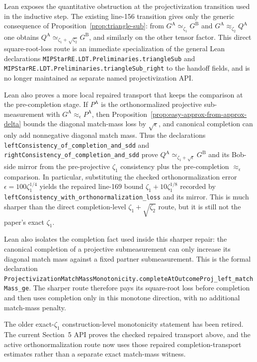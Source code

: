 \begin{remark}\label{rem:lean-line169-projectivization-match-mass}
	Lean exposes the quantitative obstruction at the projectivization transition used
	in the inductive step.  The existing line-156 transition gives only the generic
	consequence of Proposition~\ref{prop:triangle-sub}: from
	$G^{\mathrm A}\simeq_{\zeta_1}G^{\mathrm B}$ and
	$G^{\mathrm A}\approx_{\zeta_2}Q^{\mathrm A}$ one obtains
	$Q^{\mathrm A}\simeq_{\zeta_1+\sqrt{\zeta_2}}G^{\mathrm B}$, and similarly
	on the other tensor factor.  This direct square-root-loss route is an
	immediate specialization of the general Lean declarations
	\texttt{MIPStarRE.LDT.Preliminaries.triangleSub} and
	\texttt{MIPStarRE.LDT.Preliminaries.triangleSub\_right} to the handoff
	fields, and is no longer maintained as separate named projectivization API.

	Lean also proves a more local repaired transport that keeps the comparison at
	the pre-completion stage.  If $P^{\mathrm A}$ is the orthonormalized
	projective sub-measurement with $G^{\mathrm A}\approx_{\epsilon}P^{\mathrm A}$,
	then Proposition~\ref{prop:easy-approx-from-approx-delta} bounds the diagonal
	match-mass loss by $\sqrt{\epsilon}$, and canonical completion can only add
	nonnegative diagonal match mass.  Thus the declarations
	\texttt{leftConsistency\_of\_completion\_and\_sdd} and
	\texttt{rightConsistency\_of\_completion\_and\_sdd} prove
	$Q^{\mathrm A}\simeq_{\zeta_1+\sqrt{\epsilon}}G^{\mathrm B}$ and its Bob-side
	mirror from the pre-projective $\zeta_1$ consistency plus the
	pre-completion $\approx_{\epsilon}$ comparison.  In particular, substituting
	the checked orthonormalization error
	$\epsilon=100\zeta_1^{1/4}$ yields the repaired line-169 bound
	$\zeta_1+10\zeta_1^{1/8}$ recorded by
	\texttt{leftConsistency\_with\_orthonormalization\_loss} and its mirror.
	This is much sharper than the direct completion-level
	$\zeta_1+\sqrt{\zeta_2}$ route, but it is still not the paper's exact
	$\zeta_1$.

	Lean also isolates the completion fact used inside this sharper repair: the
	canonical completion of a projective submeasurement can only increase its
	diagonal match mass against a fixed partner submeasurement.  This is the formal
	declaration
	\texttt{ProjectivizationMatchMassMonotonicity.completeAtOutcomeProj\_left\_matchMass\_ge}.
	The sharper route therefore pays its square-root loss before completion and then
	uses completion only in this monotone direction, with no additional match-mass
	penalty.

	The older exact-$\zeta_1$ construction-level monotonicity statement has been
	retired.  The current Section~5 API proves the checked repaired transport above,
	and the active orthonormalization route now uses those repaired completion-transport estimates rather
	than a separate exact match-mass witness.
\end{remark}

